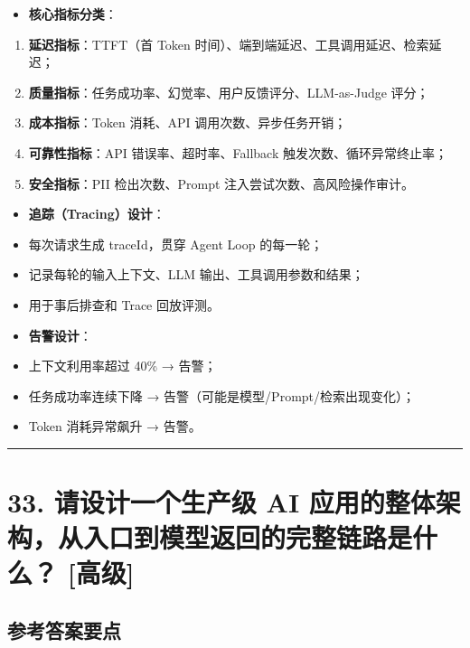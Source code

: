 \documentclass[9pt,a4paper,twocolumn]{ctexart}
\newcommand{\lvgao}{\usebox{\badgegaobox}}
\def\lvgao{[高级]}%
\begin{document}
\begin{itemize}[itemsep=1pt, topsep=2pt]
  \item \textbf{核心指标分类}：
\end{itemize}
\begin{enumerate}[itemsep=1pt, topsep=2pt]
  \item \textbf{延迟指标}：TTFT（首 Token 时间）、端到端延迟、工具调用延迟、检索延迟；
  \item \textbf{质量指标}：任务成功率、幻觉率、用户反馈评分、LLM-as-Judge 评分；
  \item \textbf{成本指标}：Token 消耗、API 调用次数、异步任务开销；
  \item \textbf{可靠性指标}：API 错误率、超时率、Fallback 触发次数、循环异常终止率；
  \item \textbf{安全指标}：PII 检出次数、Prompt 注入尝试次数、高风险操作审计。
\end{enumerate}
\begin{itemize}[itemsep=1pt, topsep=2pt]
  \item \textbf{追踪（Tracing）设计}：
  \item 每次请求生成 traceId，贯穿 Agent Loop 的每一轮；
  \item 记录每轮的输入上下文、LLM 输出、工具调用参数和结果；
  \item 用于事后排查和 Trace 回放评测。
  \item \textbf{告警设计}：
  \item 上下文利用率超过 40\% → 告警；
  \item 任务成功率连续下降 → 告警（可能是模型/Prompt/检索出现变化）；
  \item Token 消耗异常飙升 → 告警。
\end{itemize}


\vspace{2pt}
\noindent\rule{\columnwidth}{0.3pt}\vspace{2pt}





\section*{33. 请设计一个生产级 AI 应用的整体架构，从入口到模型返回的完整链路是什么？ \lvgao{}}


\subsection*{参考答案要点}
\end{document}
